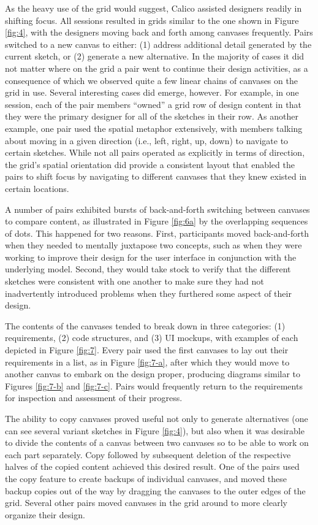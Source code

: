 As the heavy use of the grid would suggest, Calico assisted designers readily in shifting focus. All sessions resulted in grids similar to the one shown in Figure \ref{fig:4}, with the designers moving back and forth among canvases frequently. Pairs switched to a new canvas to either: (1) address additional detail generated by the current sketch, or (2) generate a new alternative. In the majority of cases it did not matter where on the grid a pair went to continue their design activities, as a consequence of which we observed quite a few linear chains of canvases on the grid in use. Several interesting cases did emerge, however. For example, in one session, each of the pair members ``owned'' a grid row of design content in that they were the primary designer for all of the sketches in their row. As another example, one pair used the spatial metaphor extensively, with members talking about moving in a given direction (i.e., left, right, up, down) to navigate to certain sketches. While not all pairs operated as explicitly in terms of direction, the grid's spatial orientation did provide a consistent layout that enabled the pairs to shift focus by navigating to different canvases that they knew existed in certain locations.   

A number of pairs exhibited bursts of back-and-forth switching between canvases to compare content, as illustrated in Figure \ref{fig:6a} by the overlapping sequences of dots. This happened for two reasons. First, participants moved back-and-forth when they needed to mentally juxtapose two concepts, such as when they were working to improve their design for the user interface in conjunction with the underlying model. Second, they would take stock to verify that the different sketches were consistent with one another to make sure they had not inadvertently introduced problems when they furthered some aspect of their design.

The contents of the canvases tended to break down in three categories: (1) requirements, (2) code structures, and (3) UI mockups, with examples of each depicted in Figure \ref{fig:7}. Every pair used the first canvases to lay out their requirements in a list, as in Figure \ref{fig:7-a}, after which they would move to another canvas to embark on the design proper, producing diagrams similar to Figures \ref{fig:7-b} and \ref{fig:7-c}. Pairs would frequently return to the requirements for inspection and assessment of their progress.

The ability to copy canvases proved useful not only to generate alternatives (one can see several variant sketches in Figure \ref{fig:4}), but also when it was desirable to divide the contents of a canvas between two canvases so to be able to work on each part separately. Copy followed by subsequent deletion of the respective halves of the copied content achieved this desired result. One of the pairs used the copy feature to create backups of individual canvases, and moved these backup copies out of the way by dragging the canvases to the outer edges of the grid. Several other pairs moved canvases in the grid around to more clearly organize their design.

